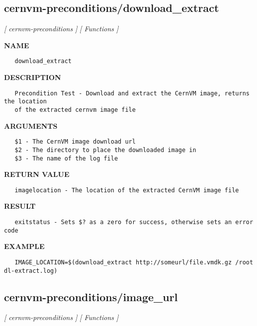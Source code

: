 \subsection{cernvm-preconditions/download\_extract}
\textsl{[ cernvm-preconditions ]}
\textsl{[ Functions ]}

\label{ch:robo4}
\label{ch:cernvm_preconditions_download_extract}
\textbf{NAME}
\begin{verbatim}
   download_extract
\end{verbatim}
\textbf{DESCRIPTION}
\begin{verbatim}
   Precondition Test - Download and extract the CernVM image, returns the location 
   of the extracted cernvm image file
\end{verbatim}
\textbf{ARGUMENTS}
\begin{verbatim}
   $1 - The CernVM image download url
   $2 - The directory to place the downloaded image in
   $3 - The name of the log file
\end{verbatim}
\textbf{RETURN VALUE}
\begin{verbatim}
   imagelocation - The location of the extracted CernVM image file
\end{verbatim}
\textbf{RESULT}
\begin{verbatim}
   exitstatus - Sets $? as a zero for success, otherwise sets an error code
\end{verbatim}
\textbf{EXAMPLE}
\begin{verbatim}
   IMAGE_LOCATION=$(download_extract http://someurl/file.vmdk.gz /root dl-extract.log)
\end{verbatim}
\newpage
\subsection{cernvm-preconditions/image\_url}
\textsl{[ cernvm-preconditions ]}
\textsl{[ Functions ]}

